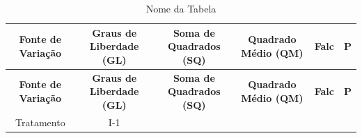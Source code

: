 \documentclass[12pt,brazil,oneside]{book}
\begin{document}
\begin{longtable}[]{@{}cccccc@{}}
\caption{Nome da Tabela}\tabularnewline
\toprule
\begin{minipage}[b]{0.14\columnwidth}\centering
\textbf{Fonte de Variação}\strut
\end{minipage} & \begin{minipage}[b]{0.14\columnwidth}\centering
\textbf{Graus de Liberdade (GL)}\strut
\end{minipage} & \begin{minipage}[b]{0.14\columnwidth}\centering
\textbf{Soma de Quadrados (SQ)}\strut
\end{minipage} & \begin{minipage}[b]{0.14\columnwidth}\centering
\textbf{Quadrado Médio (QM)}\strut
\end{minipage} & \begin{minipage}[b]{0.14\columnwidth}\centering
\textbf{Falc}\strut
\end{minipage} & \begin{minipage}[b]{0.14\columnwidth}\centering
\textbf{P}\strut
\end{minipage}\tabularnewline
\midrule
\endfirsthead
\toprule
\begin{minipage}[b]{0.14\columnwidth}\centering
\textbf{Fonte de Variação}\strut
\end{minipage} & \begin{minipage}[b]{0.14\columnwidth}\centering
\textbf{Graus de Liberdade (GL)}\strut
\end{minipage} & \begin{minipage}[b]{0.14\columnwidth}\centering
\textbf{Soma de Quadrados (SQ)}\strut
\end{minipage} & \begin{minipage}[b]{0.14\columnwidth}\centering
\textbf{Quadrado Médio (QM)}\strut
\end{minipage} & \begin{minipage}[b]{0.14\columnwidth}\centering
\textbf{Falc}\strut
\end{minipage} & \begin{minipage}[b]{0.14\columnwidth}\centering
\textbf{P}\strut
\end{minipage}\tabularnewline
\midrule
\endhead
\begin{minipage}[t]{0.14\columnwidth}\centering
Tratamento\strut
\end{minipage} & \begin{minipage}[t]{0.14\columnwidth}\centering
I-1\strut
\end{minipage} & \begin{minipage}[t]{0.14\columnwidth}\centering

\end{minipage}
\end{longtable}
\end{document}
